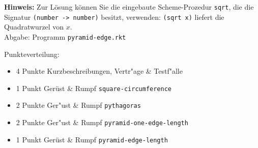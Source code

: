   \textbf{Hinweis:} Zur Lösung können Sie die eingebaute Scheme-Prozedur
    \texttt{sqrt}, die die Signatur \texttt{(number -> number)} besitzt,
    verwenden: \texttt{(sqrt x)} liefert die Quadratwurzel von $x$.\\

Abgabe: 
    Programm \texttt{pyramid-edge.rkt}


  \begin{solution}
     \smallskip
    Punkteverteilung:
    \begin{itemize}
    \item 4 Punkte Kurzbeschreibungen, Vertr"age \& Testf"alle
    \item 1 Punkt Ger\"ust \& Rumpf \texttt{square-circumference}
    \item 2 Punkte Ger"ust \& Rumpf \texttt{pythagoras}
    \item 2 Punkte Ger"ust \& Rumpf \texttt{pyramid-one-edge-length} 
    \item 1 Punkt Ger\"ust \& Rumpf \texttt{pyramid-edge-length}
    \end{itemize}

\pagebreak
     
  \end{solution}

